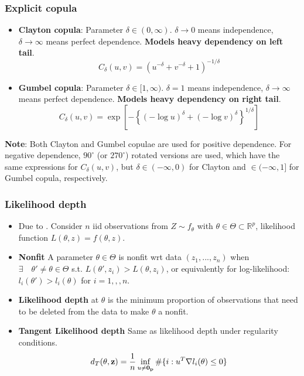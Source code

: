 \documentclass[handout,10pt]{beamer}
\newcommand{\colubf}{\color{UniBlue} \bf}
\begin{document}
\begin{frame}
\frametitle{Explicit copula}
\begin{example}
\begin{itemize}
\item \textbf{Clayton copula}: Parameter $\delta\in(0,\infty)$. $\delta\rightarrow 0$ means independence, $\delta\rightarrow\infty$ means perfect dependence. {\colubf Models heavy dependency on left tail}.
$$ C_\delta (u,v) = (u^{-\delta}+v^{-\delta}+1)^{-1/\delta} $$

\item \textbf{Gumbel copula}: Parameter $\delta\in[1,\infty)$. $\delta=1$ means independence, $\delta\rightarrow\infty$ means perfect dependence. {\colubf Models heavy dependency on right tail}.
$$ C_\delta(u,v) = \exp\left[-\left\{(-\log u)^\delta+(-\log v)^\delta\right\}^{1/\delta}\right] $$
\end{itemize}
\end{example}

\textbf{Note}: Both Clayton and Gumbel copulae are used for positive dependence. For negative dependence, $90^\circ$ (or $270^\circ$) rotated versions are used, which have the same expressions for $C_\delta(u,v)$, but $\delta\in(-\infty,0)$ for Clayton and $\in (-\infty,1]$ for Gumbel copula, respectively.
\end{frame}

\begin{frame}
\frametitle{Likelihood depth}
\begin{itemize}
\item Due to \cite{mizera1}\cite{mizera2}. Consider $n$ iid observations from $Z\sim f_\theta$ with $\theta\in\Theta\subset \mathbb{R}^p$, likelihood function $L(\theta,z) = f(\theta,z)$.
\vspace{.2cm}
\item \textbf{Nonfit} A parameter $\theta\in \Theta$ is nonfit wrt data $(z_1,...,z_n)$ when $\exists\quad \theta'\neq \theta\in \Theta$ s.t. $L(\theta',z_i)>L(\theta,z_i)$, or equivalently for log-likelihood: $l_i(\theta')>l_i(\theta)$ for $i=1,,,n$.
\vspace{.2cm}
\item \textbf{Likelihood depth} at $\theta$ is the minimum proportion of observations that need to be deleted from the data to make $\theta$ a nonfit.
\vspace{.2cm}
\item \textbf{Tangent Likelihood depth} Same as likelihood depth under regularity conditions.
$$d_T(\theta,{\bf{z}}) = \frac{1}{n}\inf_{u\neq \bf0_p} \#\{i: u^T\nabla l_i(\theta)\leq 0\} $$
\end{itemize}
\end{frame}
\end{document}
